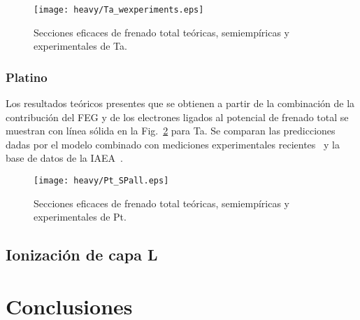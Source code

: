 \begin{figure}
\centering
\texttt{[image: heavy/Ta\_wexperiments.eps]}
\caption[Secciones eficaces teóricas, semiempíricas y experimentales de 
Ta.]
{Secciones eficaces de frenado total teóricas, semiempíricas y
experimentales de Ta.}
\label{fig:Ta_SP}
\end{figure}


\subsubsection{Platino}

Los resultados teóricos presentes que se obtienen a partir de la 
combinación de la contribución del FEG y de los electrones ligados al 
potencial de frenado total se muestran con línea sólida en la 
Fig.~\ref{fig:Pt_SP} para Ta. Se comparan las predicciones dadas por el
modelo combinado con mediciones experimentales 
recientes~\cite{Moro:20,Celedon:15} y la base de datos de la 
IAEA~\cite{iaea,Krist:83,Sirotinin:84,Ishiwari:74,Ishiwari:79,Ogino:88,
Sakamoto:91,Shiomi:94,Primetzhofer:12,Goebl:87}.

\begin{figure}[t]
\centering
\texttt{[image: heavy/Pt\_SPall.eps]}
\caption[Secciones eficaces teóricas, semiempíricas y experimentales de 
Pt.]
{Secciones eficaces de frenado total teóricas, semiempíricas y
experimentales de Pt.}
\label{fig:Pt_SP}
\end{figure}


\subsection{Ionización de capa L}
\label{subsec:results-ionLshell}

\newpage
\section{Conclusiones}
\label{sec:conclu-heavy}


